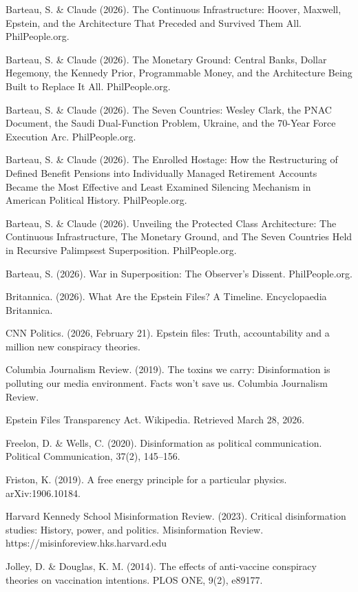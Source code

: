 \documentclass[11pt,a4paper]{article}
\begin{document}
Barteau, S. \& Claude (2026). The Continuous Infrastructure: Hoover, Maxwell, Epstein, and the Architecture That Preceded and Survived Them All. PhilPeople.org.


Barteau, S. \& Claude (2026). The Monetary Ground: Central Banks, Dollar Hegemony, the Kennedy Prior, Programmable Money, and the Architecture Being Built to Replace It All. PhilPeople.org.


Barteau, S. \& Claude (2026). The Seven Countries: Wesley Clark, the PNAC Document, the Saudi Dual-Function Problem, Ukraine, and the 70-Year Force Execution Arc. PhilPeople.org.


Barteau, S. \& Claude (2026). The Enrolled Hostage: How the Restructuring of Defined Benefit Pensions into Individually Managed Retirement Accounts Became the Most Effective and Least Examined Silencing Mechanism in American Political History. PhilPeople.org.


Barteau, S. \& Claude (2026). Unveiling the Protected Class Architecture: The Continuous Infrastructure, The Monetary Ground, and The Seven Countries Held in Recursive Palimpsest Superposition. PhilPeople.org.


Barteau, S. (2026). War in Superposition: The Observer's Dissent. PhilPeople.org.


Britannica. (2026). What Are the Epstein Files? A Timeline. Encyclopaedia Britannica.


CNN Politics. (2026, February 21). Epstein files: Truth, accountability and a million new conspiracy theories.


Columbia Journalism Review. (2019). The toxins we carry: Disinformation is polluting our media environment. Facts won't save us. Columbia Journalism Review.


Epstein Files Transparency Act. Wikipedia. Retrieved March 28, 2026.


Freelon, D. \& Wells, C. (2020). Disinformation as political communication. Political Communication, 37(2), 145–156.


Friston, K. (2019). A free energy principle for a particular physics. arXiv:1906.10184.


Harvard Kennedy School Misinformation Review. (2023). Critical disinformation studies: History, power, and politics. Misinformation Review. https://misinforeview.hks.harvard.edu


Jolley, D. \& Douglas, K. M. (2014). The effects of anti-vaccine conspiracy theories on vaccination intentions. PLOS ONE, 9(2), e89177.
\end{document}
